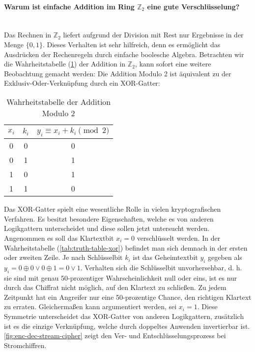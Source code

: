 \paragraph{Warum ist einfache Addition im Ring $\mathbb{Z}_2$ eine gute Verschlüsselung?}\mbox{}\\
Das Rechnen in $\mathbb{Z}_2$ liefert aufgrund der Division mit Rest nur Ergebnisse in
der Menge $\{0,1\}$. Dieses Verhalten ist sehr hilfreich, denn es ermöglicht das Ausdrücken der
Rechenregeln durch einfache boolesche Algebra.
Betrachten wir die Wahrheitstabelle (\ref{tab:truth-table-addition-mod-2})
der Addition in $\mathbb{Z}_2$, kann sofort eine weitere Beobachtung gemacht werden:
Die Addition Modulo 2 ist äquivalent zu der Exklusiv-Oder-Verknüpfung durch ein
XOR-Gatter:

\begin{table}[h]
  \centering
  \caption{Wahrheitstabelle der Addition Modulo 2}
  \begin{tabular}{cc|c}
    $x_i$ & $k_i$ & $y_i \equiv x_i + k_i \pmod{2}$ \\ \hline
    0     & 0     & 0                               \\
    0     & 1     & 1                               \\
    1     & 0     & 1                               \\
    1     & 1     & 0                               \\
  \end{tabular}
  \label{tab:truth-table-addition-mod-2}
\end{table}

\noindent
Das XOR-Gatter spielt eine wesentliche Rolle in vielen kryptografischen Verfahren.
Es besitzt besondere Eigenschaften, welche es von anderen Logikgattern
unterscheidet und diese sollen jetzt untersucht werden.
Angenommen es soll das Klartextbit $x_i = 0$ verschlüsselt werden. In der Wahrheitstabelle
(\ref{tab:truth-table-xor}) befindet
man sich demnach in der ersten oder zweiten Zeile.
Je nach Schlüsselbit $k_i$ ist das Geheimtextbit $y_i$ gegeben als
$y_i = 0 \oplus 0 \vee 0 \oplus 1 = 0 \vee 1$.
Verhalten sich die Schlüsselbit unvorhersehbar, d. h. sie sind mit genau 50-prozentiger
Wahrscheinlichkeit null oder eins, ist es nur durch das Chiffrat nicht möglich, auf
den Klartext zu schließen. Zu jedem Zeitpunkt hat ein Angreifer nur eine
50-prozentige Chance, den richtigen Klartext zu erraten.
Gleichermaßen kann argumentiert werden, sei $x_i = 1$.
Diese Symmetrie unterscheidet das XOR-Gatter von anderen Logikgattern, zusätzlich ist es die einzige
Verknüpfung, welche durch doppeltes Anwenden invertierbar ist.
\autoref{fig:enc-dec-stream-cipher} zeigt den Ver- und Entschlüsselungsprozess
bei Stromchiffren.

